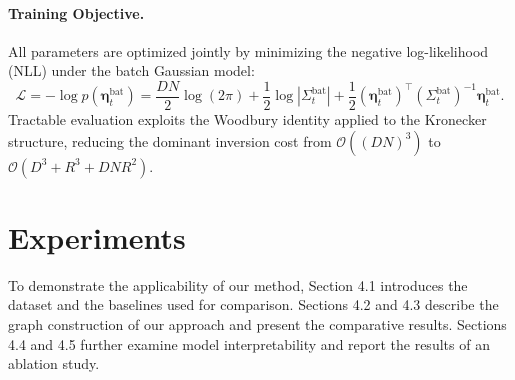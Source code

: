 \documentclass{article}
\theoremstyle{plain}
\theoremstyle{definition}
\theoremstyle{remark}
\begin{document}
\paragraph{Training Objective. }
\label{ssec:training}

All parameters are optimized jointly by minimizing the negative log-likelihood
(NLL) under the batch Gaussian model:
\begin{equation}
  \mathcal{L}
    = -\log p(\boldsymbol{\eta}_t^{\mathrm{bat}})
    = \frac{DN}{2}\log(2\pi)
      + \frac{1}{2}\log|\Sigma_t^{\mathrm{bat}}|
      + \frac{1}{2}(\boldsymbol{\eta}_t^{\mathrm{bat}})^\top
          (\Sigma_t^{\mathrm{bat}})^{-1}
          \boldsymbol{\eta}_t^{\mathrm{bat}}.
  \label{eq:nll}
\end{equation}
Tractable evaluation exploits the Woodbury identity applied to the Kronecker
structure, reducing the dominant inversion cost from $\mathcal{O}((DN)^3)$
to $\mathcal{O}(D^3 + R^3 + DNR^2)$.


\section{Experiments}
To demonstrate the applicability of our method, Section 4.1 introduces the dataset and the baselines used for comparison. Sections 4.2 and 4.3 describe the graph construction of our approach and present the comparative results. Sections 4.4 and 4.5 further examine model interpretability and report the results of an ablation study.
\label{sec:experiments}
\end{document}
